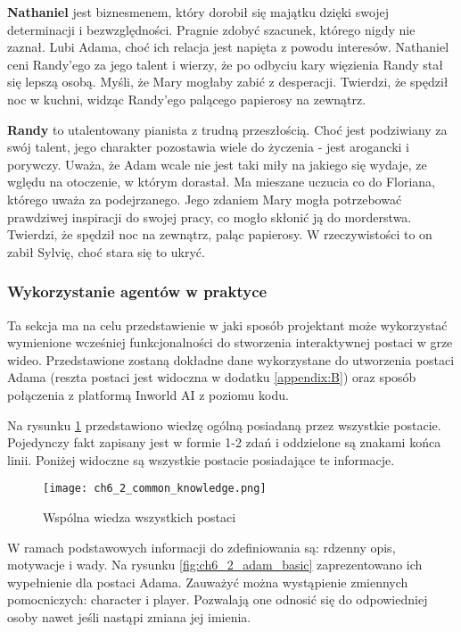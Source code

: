\textbf{Nathaniel} jest biznesmenem, który dorobił się majątku dzięki swojej determinacji i bezwzględności.
Pragnie zdobyć szacunek, którego nigdy nie zaznał. Lubi Adama, choć ich relacja jest
napięta z powodu interesów. Nathaniel ceni Randy'ego za jego talent i wierzy, że po odbyciu kary
więzienia Randy stał się lepszą osobą. Myśli, że Mary mogłaby zabić z desperacji. Twierdzi, że
spędził noc w kuchni, widząc Randy'ego palącego papierosy na zewnątrz.

\textbf{Randy} to utalentowany pianista z trudną przeszłością. Choć jest podziwiany za swój talent, jego
charakter pozostawia wiele do życzenia - jest arogancki i porywczy. Uważa, że Adam wcale nie jest taki
miły na jakiego się wydaje, ze wględu na otoczenie, w którym dorastał. Ma mieszane uczucia co do Floriana,
którego uważa za podejrzanego. Jego zdaniem Mary mogła potrzebować prawdziwej inspiracji do swojej pracy, co
mogło skłonić ją do morderstwa. Twierdzi, że spędził noc na zewnątrz, paląc papierosy. W rzeczywistości
to on zabił Sylvię, choć stara się to ukryć.

\subsubsection*{Wykorzystanie agentów w praktyce}

Ta sekcja ma na celu przedstawienie w jaki sposób projektant może wykorzystać wymienione wcześniej
funkcjonalności do stworzenia interaktywnej postaci w grze wideo. Przedstawione zostaną dokładne dane
wykorzystane do utworzenia postaci Adama (reszta postaci jest widoczna w dodatku \ref{appendix:B}) oraz
sposób połączenia z platformą Inworld AI z poziomu kodu.

\newpage

Na rysunku \ref{fig:ch6_2_common_knowledge} przedstawiono wiedzę ogólną posiadaną przez wszystkie postacie.
Pojedynczy fakt zapisany jest w formie 1-2 zdań i oddzielone są znakami końca linii. Poniżej widoczne
są wszystkie postacie posiadające te informacje.

\begin{figure}[h!]
    \centering
    \texttt{[image: ch6\_2\_common\_knowledge.png]}
    \caption{Wspólna wiedza wszystkich postaci}
    \label{fig:ch6_2_common_knowledge}
\end{figure}

\newpage

W ramach podstawowych informacji do zdefiniowania są: rdzenny opis, motywacje i wady. Na rysunku
\ref{fig:ch6_2_adam_basic} zaprezentowano ich wypełnienie dla postaci Adama. Zauważyć można wystąpienie
zmiennych pomocniczych: {character} i {player}. Pozwalają one odnosić się do odpowiedniej osoby nawet
jeśli nastąpi zmiana jej imienia.

